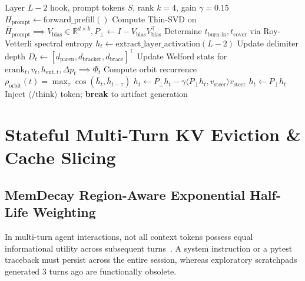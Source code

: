 \documentclass[10pt,twocolumn,letterpaper]{article}
\begin{document}
\begin{algorithm}[t]
\caption{In-Flight Manifold Governor \& Dynamic Stopping}
\label{alg:governor}
\begin{algorithmic}[1]
\Require Layer $L-2$ hook, prompt tokens $S$, rank $k=4$, gain $\gamma=0.15$
\State $H_{\text{prompt}} \gets \text{forward\_prefill}()$
\State Compute Thin-SVD on $\bar{H}_{\text{prompt}} \implies V_{\text{bias}} \in \mathbb{R}^{d \times k}, P_\perp \gets I - V_{\text{bias}} V_{\text{bias}}^\top$
\State Determine $t_{\text{burn-in}}, t_{\text{cover}}$ via Roy-Vetterli spectral entropy
    \State $h_t \gets \text{extract\_layer\_activation}(L-2)$
    \State Update delimiter depth $D_t \gets [d_{\text{paren}}, d_{\text{bracket}}, d_{\text{brace}}]^\top$
    \State Update Welford stats for $\text{erank}_t, v_t, h_{\text{ent}, t}, \Delta p_t \implies \Phi_t$
    \State Compute orbit recurrence $\rho_{\text{orbit}}(t) = \max_\tau \cos(\bar{h}_t, \bar{h}_{t-\tau})$
        \State $h_t \gets P_\perp h_t - \gamma \langle P_\perp h_t, v_{\text{steer}} \rangle v_{\text{steer}}$
    \Else
        \State $h_t \gets P_\perp h_t$
    \EndIf
        \State Inject $\langle/\text{think}\rangle$ token; \textbf{break} to artifact generation
    \EndIf
\EndFor
\end{algorithmic}
\end{algorithm}

\section{Stateful Multi-Turn KV Eviction \& Cache Slicing}

\subsection{MemDecay Region-Aware Exponential Half-Life Weighting}
In multi-turn agent interactions, not all context tokens possess equal informational utility across subsequent turns~\cite{matam2026memdecay,li2026intentkv}. A system instruction or a pytest traceback must persist across the entire session, whereas exploratory scratchpads generated 3 turns ago are functionally obsolete.
\end{document}

